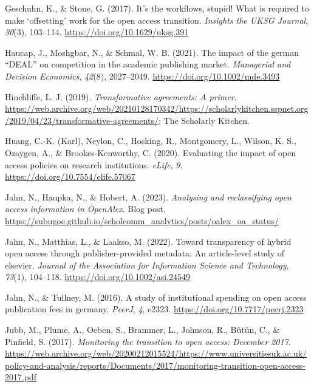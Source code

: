 \documentclass[a4paper,man,floatsintext,longtable,noextraspace,12pt]{apa6}
\newenvironment{CSLReferences}%
  {}%
  {\par}
\begin{document}
\begin{CSLReferences}{1}{0}
\leavevmode{}%
Geschuhn, K., \& Stone, G. (2017). It's the workflows, stupid! What is
required to make {`offsetting'} work for the open access transition.
\emph{Insights the {UKSG} Journal}, \emph{30}(3), 103--114.
\url{https://doi.org/10.1629/uksg.391}

\leavevmode{}%
Haucap, J., Moshgbar, N., \& Schmal, W. B. (2021). The impact of the
german {``DEAL''} on competition in the academic publishing market.
\emph{Managerial and Decision Economics}, \emph{42}(8), 2027--2049.
\url{https://doi.org/10.1002/mde.3493}

\leavevmode{}%
Hinchliffe, L. J. (2019). \emph{Transformative agreements: A primer}.
\url{https://web.archive.org/web/20210128170342/https://scholarlykitchen.sspnet.org/2019/04/23/transformative-agreements/};
The Scholarly Kitchen.

\leavevmode{}%
Huang, C.-K. (Karl), Neylon, C., Hosking, R., Montgomery, L., Wilson, K.
S., Ozaygen, A., \& Brookes-Kenworthy, C. (2020). Evaluating the impact
of open access policies on research institutions. \emph{{eLife}},
\emph{9}. \url{https://doi.org/10.7554/elife.57067}

\leavevmode{}%
Jahn, N., Haupka, N., \& Hobert, A. (2023). \emph{Analysing and
reclassifying open access information in OpenAlex}. Blog post.
\url{https://subugoe.github.io/scholcomm_analytics/posts/oalex_oa_status/}

\leavevmode{}%
Jahn, N., Matthias, L., \& Laakso, M. (2022). Toward transparency of
hybrid open access through publisher-provided metadata: An article-level
study of elsevier. \emph{Journal of the Association for Information
Science and Technology}, \emph{73}(1), 104--118.
\url{https://doi.org/10.1002/asi.24549}

\leavevmode{}%
Jahn, N., \& Tullney, M. (2016). A study of institutional spending on
open access publication fees in germany. \emph{{PeerJ}}, \emph{4},
e2323. \url{https://doi.org/10.7717/peerj.2323}

\leavevmode{}%
Jubb, M., Plume, A., Oeben, S., Brammer, L., Johnson, R., Bütün, C., \&
Pinfield, S. (2017). \emph{Monitoring the transition to open access:
December 2017}.
\url{https://web.archive.org/web/20200212015524/https://www.universitiesuk.ac.uk/policy-and-analysis/reports/Documents/2017/monitoring-transition-open-access-2017.pdf}


\end{CSLReferences}
\end{document}
